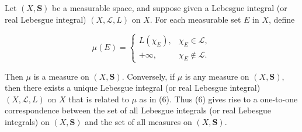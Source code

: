 Let $(X, \mathbf{S})$ be a measurable space, and suppose given a Lebesgue integral (or real Lebesgue integral) $(X, \mathcal{L}, L)$ on $X$. For each measurable set $E$ in $X$, define

$$\mu(E) = \begin{cases} L(\chi_E), & \chi_E \in \mathcal{L}, \\ +\infty, & \chi_E \notin \mathcal{L}. \end{cases}$$

Then $\mu$ is a measure on $(X, \mathbf{S})$. Conversely, if $\mu$ is any measure on $(X, \mathbf{S})$, then there exists a unique Lebesgue integral (or real Lebesgue integral) $(X, \mathcal{L}, L)$ on $X$ that is related to $\mu$ as in (6). Thus (6) gives rise to a one-to-one correspondence between the set of all Lebesgue integrals (or real Lebesgue integrals) on $(X, \mathbf{S})$ and the set of all measures on $(X, \mathbf{S})$.

